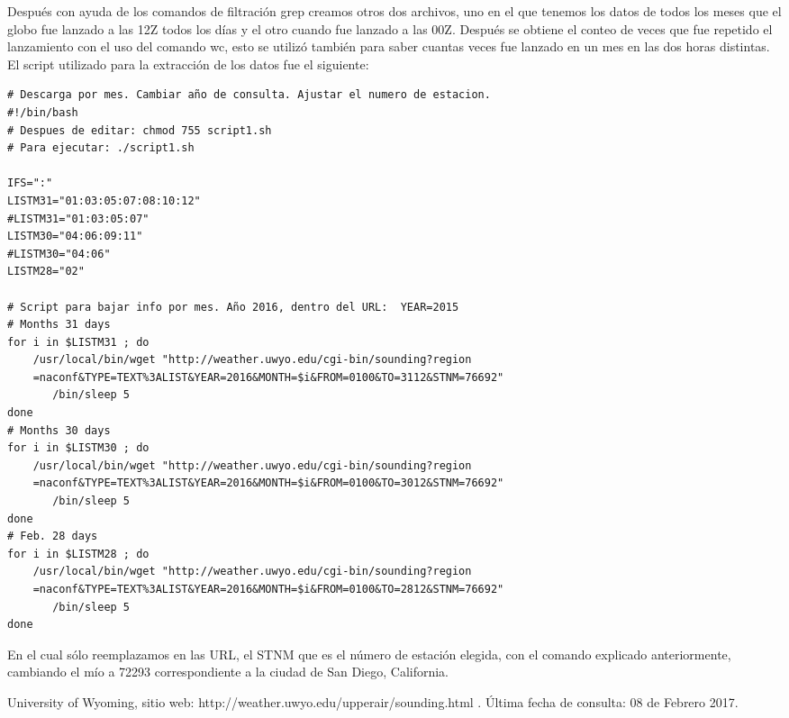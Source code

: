 \documentclass[12pt]{article}
\begin{document}
Después con ayuda de los comandos de filtración grep creamos otros dos archivos, uno en el que tenemos los datos de todos los meses que el globo fue lanzado a las 12Z todos los días y el otro cuando fue lanzado a las 00Z. Después se obtiene el conteo de veces que fue repetido el lanzamiento con el uso del comando wc, esto se utilizó también para saber cuantas veces fue lanzado en un mes en las dos horas distintas. \\

El script utilizado para la extracción de los datos fue el siguiente: \\
\begin{verbatim}
# Descarga por mes. Cambiar año de consulta. Ajustar el numero de estacion.
#!/bin/bash
# Despues de editar: chmod 755 script1.sh
# Para ejecutar: ./script1.sh

IFS=":"
LISTM31="01:03:05:07:08:10:12"
#LISTM31="01:03:05:07"
LISTM30="04:06:09:11"
#LISTM30="04:06"
LISTM28="02"

# Script para bajar info por mes. Año 2016, dentro del URL:  YEAR=2015
# Months 31 days
for i in $LISTM31 ; do
    /usr/local/bin/wget "http://weather.uwyo.edu/cgi-bin/sounding?region
    =naconf&TYPE=TEXT%3ALIST&YEAR=2016&MONTH=$i&FROM=0100&TO=3112&STNM=76692"
       /bin/sleep 5
done
# Months 30 days
for i in $LISTM30 ; do
    /usr/local/bin/wget "http://weather.uwyo.edu/cgi-bin/sounding?region
    =naconf&TYPE=TEXT%3ALIST&YEAR=2016&MONTH=$i&FROM=0100&TO=3012&STNM=76692"
       /bin/sleep 5
done
# Feb. 28 days
for i in $LISTM28 ; do
    /usr/local/bin/wget "http://weather.uwyo.edu/cgi-bin/sounding?region
    =naconf&TYPE=TEXT%3ALIST&YEAR=2016&MONTH=$i&FROM=0100&TO=2812&STNM=76692"
       /bin/sleep 5
done
\end{verbatim}

En el cual sólo reemplazamos en las URL, el STNM que es el número de estación elegida, con el comando explicado anteriormente, cambiando el mío a 72293 correspondiente a la ciudad de San Diego, California.



\begin{thebibliography}{9}
University of Wyoming, sitio web: http://weather.uwyo.edu/upperair/sounding.html . Última fecha de consulta: 08 de Febrero 2017.
\end{thebibliography}
\end{document}
